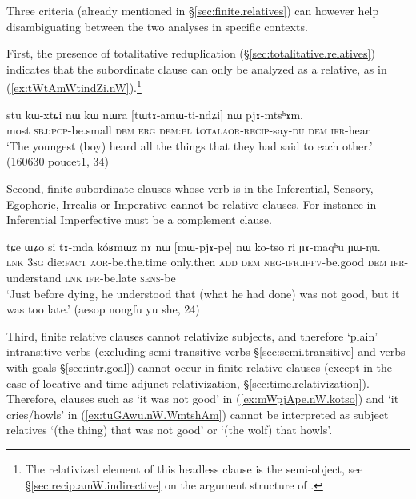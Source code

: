 Three criteria (already mentioned in §\ref{sec:finite.relatives}) can however help disambiguating between the two analyses in specific contexts. 

First, the presence of totalitative reduplication (§\ref{sec:totalitative.relatives}) indicates that the subordinate clause can only be analyzed as a relative, as in (\ref{ex:tWtAmWtindZi.nW}).\footnote{The relativized element of this headless clause is the semi-object, see §\ref{sec:recip.amW.indirective} on the argument structure of . }
 
\begin{exe}
\ex \label{ex:tWtAmWtindZi.nW}
\gll  stu kɯ-xtɕi nɯ kɯ nɯra [tɯ\redp{}tɤ-amɯ-ti-ndʑi] nɯ pjɤ-mtsʰɤm. \\
most \textsc{sbj}:\textsc{pcp}-be.small \textsc{dem} \textsc{erg} \textsc{dem}:\textsc{pl} t\textsc{otal}\redp{}\textsc{aor}-\textsc{recip}-say-\textsc{du} \textsc{dem} \textsc{ifr}-hear \\
\glt `The youngest (boy) heard all the things that they had said to each other.' (160630 poucet1, 34)
\end{exe}

Second, finite subordinate clauses whose verb is in the Inferential, Sensory, Egophoric, Irrealis or Imperative cannot be relative clauses. For instance  in Inferential Imperfective must be a complement clause.

\begin{exe}
\ex \label{ex:mWpjApe.nW.kotso}
\gll tɕe ɯʑo si tɤ-mda kóʁmɯz nɤ nɯ [mɯ-pjɤ-pe] nɯ ko-tso ri ɲɤ-maqʰu ɲɯ-ŋu. \\
\textsc{lnk} \textsc{3sg} die:\textsc{fact} \textsc{aor}-be.the.time only.then \textsc{add} \textsc{dem} \textsc{neg}-\textsc{ifr}.\textsc{ipfv}-be.good \textsc{dem} \textsc{ifr}-understand \textsc{lnk} \textsc{ifr}-be.late \textsc{sens}-be \\
\glt  `Just before dying, he understood that (what he had done) was not good, but it was too late.' (aesop nongfu yu she, 24)
\end{exe}

Third, finite relative clauses cannot relativize subjects, and therefore `plain' intransitive verbs (excluding semi-transitive verbs §\ref{sec:semi.transitive} and verbs with goals §\ref{sec:intr.goal}) cannot occur in finite relative clauses (except in the case of locative and time adjunct relativization, §\ref{sec:time.relativization}). Therefore, clauses such as  `it was not good' in (\ref{ex:mWpjApe.nW.kotso}) and  `it cries/howls' in (\ref{ex:tuGAwu.nW.WmtshAm}) cannot be interpreted as subject relatives `(the thing) that was not good' or `(the wolf) that howls'.

